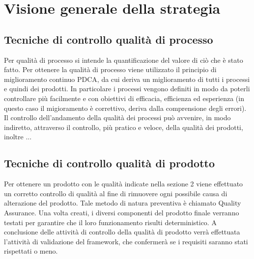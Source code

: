 
\section{Visione generale della strategia}
\subsection{Tecniche di controllo qualità di processo}
	Per qualità di processo si intende la quantificazione del valore di ciò che è stato fatto. Per ottenere la qualità di processo viene utilizzato il principio di miglioramento continuo PDCA, da cui deriva un miglioramento di tutti i processi e quindi dei prodotti.
	In particolare i processi vengono definiti in modo da poterli controllare più facilmente e con obiettivi di efficacia, efficienza ed esperienza (in questo caso il migioramento è correttivo, deriva dalla comprensione degli errori).
	Il controllo dell'andamento della qualità dei processi può avvenire, in modo indiretto, attraverso il controllo, più pratico e veloce, della qualità dei prodotti, inoltre ...
\subsection{Tecniche di controllo qualità di prodotto}
	Per ottenere un prodotto con le qualità indicate nella sezione 2 viene effettuato un corretto controllo di qualità al fine di rimuovere ogni possibile causa di alterazione del prodotto. Tale metodo di natura preventiva è chiamato Quality Assurance.
	Una volta creati, i diversi componenti del prodotto finale verranno testati per garantire che il loro funzionamento risulti deterministico.
	A conclusione delle attività di controllo della qualità di prodotto verrà effettuata l'attività di validazione del framework, che confermerà se i requisiti saranno stati rispettati o meno.
